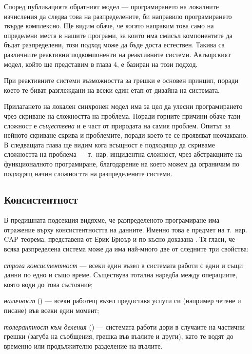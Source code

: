 Според публикацията обратният модел — програмирането на локалните изчисления да следва това на разпределените, би направило програмирането твърде комплексно. Ще видим обаче, че когато направим това само на определени места в нашите програми, за които има смисъл компонентите да бъдат разпределени, този подход може да бъде доста естествен. Такива са различните реактивни подкомпоненти на реактивните системи. Актьорският модел, който ще представим в глава 4, е базиран на този подход.

При реактивните системи възможността за грешки е основен принцип, поради което те биват разглеждани на всеки един етап от дизайна на системата.

Прилагането на локален синхронен модел има за цел да улесни програмирането чрез скриване на сложността на проблема. Поради горните причини обаче тази сложност е \emph{съществена} \cite{brroks1987NoSilverBullet} и е част от природата на самия проблем. Опитът за нейното скриване скрива и проблемите, поради което те се проявяват неочаквано. В следващата глава ще видим кога всъщност е подходящо да скриваме сложността на проблема — т.~нар. инцидентна сложност, чрез абстракциите на функционалното програмиране, благодарение на което можем да ограничим по подходящ начин сложността на разпределените системи.

\subsection{Консистентност}
\label{sec:consistency-and-cap}

В предишната подсекция видяхме, че разпределеното програмиране има отражение върху консистентността на данните. Именно това е предмет на т.~нар. CAP теорема, представена от Ерик Брюър \cite{fox1999CAP} и по-късно доказана \cite{gilber2002CAP}. Тя гласи, че всяка разпределена система може да има най-много две от следните три свойства:

\begin{itemize*}
  \item \emph{строга консистентност} — всеки един възел в системата работи с едни и същи данни по едно и също време. Съществува тотална наредба между операциите, която води до това състояние;
  \item \emph{наличност} () — всеки работещ възел предоставя услуги си (например четене и писане) във всеки един момент;
  \item \emph{толерантност към деления} () — системата работи дори в случаите на частични грешки (загуба на съобщения, грешка във възлите и други), като те водят до временно или продължително разделение на възлите.
\end{itemize*}


